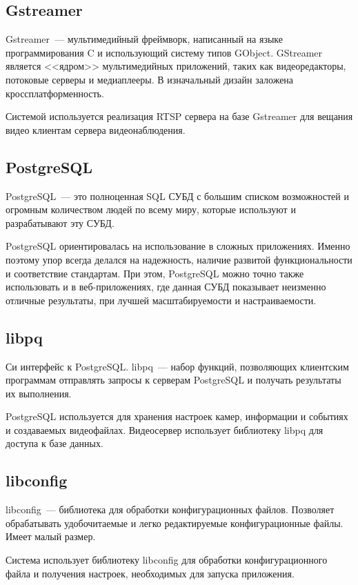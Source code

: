 \subsection{Gstreamer}
Gstreamer~--- мультимедийный фреймворк, написанный на языке программирования C и
использующий систему типов GObject. GStreamer является <<ядром>> мультимедийных приложений,
таких как видеоредакторы, потоковые серверы и медиаплееры. В изначальный дизайн заложена
кроссплатформенность.

Системой используется реализация RTSP сервера на базе Gstreamer для вещания видео клиентам сервера
видеонаблюдения.

\subsection{PostgreSQL}
PostgreSQL~--- это полноценная SQL СУБД с большим списком возможностей и огромным количеством
людей по всему миру, которые используют и разрабатывают эту СУБД.

PostgreSQL ориентировалась на использование в сложных приложениях. Именно поэтому упор всегда делался
на надежность, наличие развитой функциональности и соответствие стандартам. При этом, PostgreSQL
можно точно также использовать и в веб-приложениях, где данная СУБД показывает неизменно отличные
результаты, при лучшей масштабируемости и настраиваемости.

\subsection{libpq}
Си интерфейс к PostgreSQL. libpq~--- набор функций, позволяющих клиентским программам
отправлять запросы к серверам PostgreSQL и получать результаты их выполнения.

PostgreSQL используется для хранения настроек камер, информации и событиях и создаваемых видеофайлах.
Видеосервер использует библиотеку libpq для доступа к базе данных.

\subsection{libconfig}
libconfig~--- библиотека для обработки конфигурационных файлов.
Позволяет обрабатывать удобочитаемые и легко редактируемые конфигурационные файлы.
Имеет малый размер.

Система использует библиотеку libconfig для обработки конфигурационного файла и получения настроек,
необходимых для запуска приложения.

